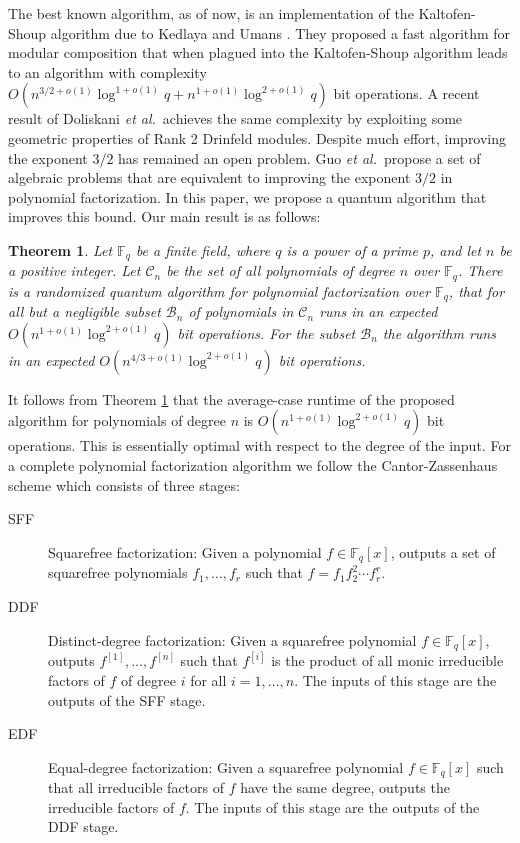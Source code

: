 \documentclass{article}
\theoremstyle{plain}
\newtheorem{theorem}{Theorem}
\theoremstyle{definition}
\def\F{\ensuremath{\mathbb{F}}}
\begin{document}
The best known algorithm, as of now, is an implementation of the Kaltofen-Shoup algorithm due to 
Kedlaya and Umans \cite{kedlaya2011fast}. They proposed a fast algorithm for modular composition 
that when plagued into the Kaltofen-Shoup algorithm leads to an algorithm with complexity 
$O(n^{3/2 + o(1)}\log^{1 + o(1)}q + n^{1 + o(1)}\log^{2 + o(1)}q)$ bit operations. A recent 
result of Doliskani \textit{et al.}\,\cite{doliskani2017drinfeld} achieves the same complexity by 
exploiting some geometric properties of Rank 2 Drinfeld modules. Despite much effort, improving the 
exponent $3 / 2$ has remained an open problem. Guo \textit{et al.}\,\cite{guo2016alg} propose a set 
of algebraic problems that are equivalent to improving the exponent $3 / 2$ in polynomial 
factorization. In this paper, we propose a quantum algorithm that improves this bound. Our main 
result is as follows:
\begin{theorem}
	\label{thm:main}
	Let $\F_q$ be a finite field, where $q$ is a power of a prime $p$, and let $n$ be a positive 
	integer. Let $\mathcal{C}_n$ be the set of all polynomials of degree $n$ over $\F_q$. There is 
	a randomized quantum algorithm for polynomial factorization over $\F_q$, that for all but a 
	negligible subset $\mathcal{B}_n$ of polynomials in $\mathcal{C}_n$ runs in an expected 
	$O(n^{1 + o(1)} \log^{2 + o(1)}q)$ bit operations. For the subset $\mathcal{B}_n$ the algorithm 
	runs in an expected $O(n^{4 / 3 + o(1)} \log^{2 + o(1)}q)$ bit operations.
\end{theorem}
It follows from Theorem \ref{thm:main} that the average-case runtime of the proposed algorithm for 
polynomials of degree $n$ is $O(n^{1 + o(1)} \log^{2 + o(1)}q)$ bit operations. This is essentially 
optimal with respect to the degree of the input. For a complete polynomial factorization algorithm 
we follow the Cantor-Zassenhaus scheme which consists of three stages:
\begin{description}
	\item[SFF] Squarefree factorization: Given a polynomial $f \in \F_q[x]$, outputs a set of 
	squarefree polynomials $f_1, \dots, f_r$ such that $f = f_1 f_2^2 \cdots f_r^r$.
	\item[DDF] Distinct-degree factorization: Given a squarefree polynomial $f \in \F_q[x]$, 
	outputs $f^{[1]}, \dots, f^{[n]}$ such that $f^{[i]}$ is the product of all monic irreducible	
	factors of $f$ of degree $i$ for all $i = 1, \dots, n$. The inputs of this stage are the 
	outputs of the SFF stage.
	\item[EDF] Equal-degree factorization: Given a squarefree polynomial $f \in \F_q[x]$ such that
	all irreducible factors of $f$ have the same degree, outputs the irreducible factors of $f$. 
	The inputs of this stage are the outputs of the DDF stage.
\end{description}
\end{document}
